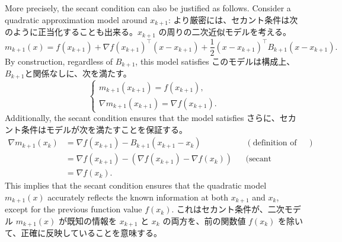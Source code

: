 \documentclass[0_main]{subfiles}
\begin{document}
\ifEn
    More precisely, the secant condition can also be justified as follows. Consider a quadratic approximation model around $x_{k+1}$:
\else
    より厳密には、セカント条件は次のように正当化することも出来る。$x_{k+1}$ の周りの二次近似モデルを考える。
\fi
\begin{equation*}
    m_{k+1}(x) = f(x_{k+1}) + \nabla f(x_{k+1})^\top (x - x_{k+1}) + \frac{1}{2} (x - x_{k+1})^\top B_{k+1} (x - x_{k+1}).
\end{equation*}
\ifEn
    By construction, regardless of $B_{k+1}$, this model satisfies
\else
    このモデルは構成上、$B_{k+1}$と関係なしに、次を満たす。
\fi
\begin{equation*}
    \begin{cases}
        m_{k+1}(x_{k+1}) = f(x_{k+1}), \\
        \nabla m_{k+1}(x_{k+1}) = \nabla f(x_{k+1}).
    \end{cases}
\end{equation*}
\ifEn
    Additionally, the secant condition ensures that the model satisfies
\else
    さらに、セカント条件はモデルが次を満たすことを保証する。
\fi
\begin{align*}
    \nabla m_{k+1}(x_k) & = \nabla f(x_{k+1}) - B_{k+1} (x_{k+1} - x_k)             &  & (\text{definition of model}) \\
                        & = \nabla f(x_{k+1}) - (\nabla f(x_{k+1}) - \nabla f(x_k)) &  & \text{(secant condition)}    \\
                        & = \nabla f(x_k).
\end{align*}
\ifEn
    This implies that the secant condition ensures that the quadratic model $m_{k+1}(x)$ accurately reflects the known information at both $x_{k+1}$ and $x_k$, except for the previous function value $f(x_k)$.
\else
    これはセカント条件が、二次モデル $m_{k+1}(x)$ が既知の情報を $x_{k+1}$ と $x_k$ の両方を、前の関数値 $f(x_k)$ を除いて、正確に反映していることを意味する。
\fi
\end{document}
